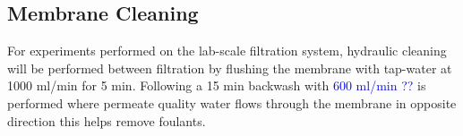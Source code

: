 \subsection{Membrane Cleaning}

For experiments performed on the lab-scale filtration system, hydraulic cleaning will be performed between filtration by flushing the membrane with tap-water at 1000 ml/min for 5 min. 
Following a 15 min backwash with \textcolor{blue}{600 ml/min ??} is performed where permeate quality water flows through the membrane in opposite direction this helps remove foulants. \citep{NXfiltration_operation_manual}




